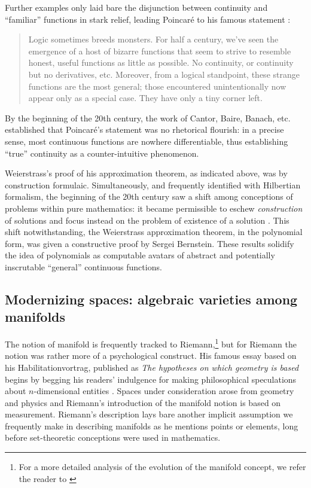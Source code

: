 \documentclass[11pt,leqno]{article}
\renewcommand{\1}{{\rm 1\hspace*{-0.4ex}%
\rule{0.1ex}{1.52ex}\hspace*{0.2ex}}}
\newcommand{\<}[1]{{\langle}#1 {\rangle}}
\newcounter{intro}
\theoremstyle{plain}
\theoremstyle{definition}
\theoremstyle{remark}
\numberwithin{equation}{subsection}
\begin{document}
Further examples only laid bare the disjunction between continuity and ``familiar'' functions in stark relief, leading Poincar\'e to his famous statement \cite{PoinareDefinitions}:
\begin{quote}
	Logic sometimes breeds monsters. For half a century, we’ve seen the emergence of a host of bizarre functions that seem to strive to resemble honest, useful functions as little as possible. No continuity, or continuity but no derivatives, etc. Moreover, from a logical standpoint, these strange functions are the most general; those encountered unintentionally now appear only as a special case.  They have only a tiny corner left.
\end{quote}
By the beginning of the 20th century, the work of Cantor, Baire, Banach, etc. established that Poincar\'e's statement was no rhetorical flourish: in a precise sense, most continuous functions are nowhere differentiable, thus establishing ``true'' continuity as a counter-intuitive phenomenon.  

Weierstrass's proof of his approximation theorem, as indicated above, was by construction formulaic.  Simultaneously, and frequently identified with Hilbertian formalism, the beginning of the 20th century saw a shift among conceptions of problems within pure mathematics: it became permissible to eschew {\em construction} of solutions and focus instead on the problem of existence of a solution \cite[p. 336]{monna1983algebraic}.  This shift notwithstanding, the Weierstrass approximation theorem, in the polynomial form, was given a constructive proof by Sergei Bernstein.  These results solidify the idea of polynomials as computable avatars of abstract and potentially inscrutable ``general'' continuous functions.

\subsection{Modernizing spaces: algebraic varieties among manifolds}
The notion of manifold is frequently tracked to Riemann,\footnote{For a more detailed analysis of the evolution of the manifold concept, we refer the reader to \cite{Scholz}} but for Riemann the notion was rather more of a psychological construct.  His famous essay based on his Habilitationvortrag, published as {\em The hypotheses on which geometry is based} begins by begging his readers' indulgence for making philosophical speculations about $n$-dimensional entities \cite[p. 257]{Riemann}.  Spaces under consideration arose from geometry and physics and Riemann's introduction of the manifold notion is based on measurement.  Riemann's description lays bare another implicit assumption we frequently make in describing manifolds as he mentions points or elements, long before set-theoretic conceptions were used in mathematics.
\end{document}

